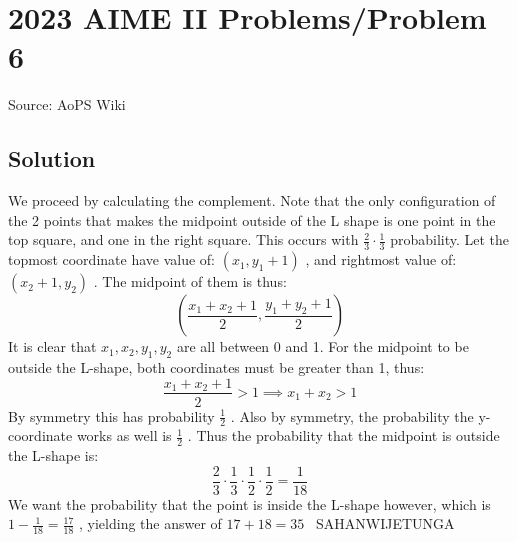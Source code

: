 \documentclass[12pt]{article}
\begin{document}
\section*{{2023 AIME II Problems/Problem 6}}
Source: AoPS Wiki

\subsection*{Solution}
We proceed by calculating the complement. Note that the only configuration of the 2 points that makes the midpoint outside of the L shape is one point in the top square, and one in the right square. This occurs with $\frac{2}{3} \cdot \frac{1}{3}$ probability. Let the topmost coordinate have value of: $(x_1,y_1+1)$ , and rightmost value of: $(x_2+1,y_2)$ . The midpoint of them is thus: \[\left(\frac{x_1+x_2+1}{2}, \frac{y_1+y_2+1}{2} \right)\] It is clear that $x_1, x_2, y_1, y_2$ are all between 0 and 1. For the midpoint to be outside the L-shape, both coordinates must be greater than 1, thus: \[\frac{x_1+x_2+1}{2}>1 \implies x_1+x_2>1\] By symmetry this has probability $\frac{1}{2}$ . Also by symmetry, the probability the y-coordinate works as well is $\frac{1}{2}$ . Thus the probability that the midpoint is outside the L-shape is: \[\frac{2}{3} \cdot \frac{1}{3} \cdot \frac{1}{2} \cdot \frac{1}{2} = \frac{1}{18}\] We want the probability that the point is inside the L-shape however, which is $1-\frac{1}{18}=\frac{17}{18}$ , yielding the answer of $17+18=\boxed{35}$ ~SAHANWIJETUNGA
\end{document}
